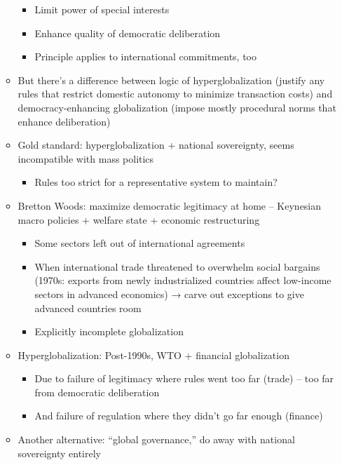 \begin{itemize}
\begin{itemize}
    \begin{itemize}
    \tightlist
    \item
      Limit power of special interests
    \item
      Enhance quality of democratic deliberation
    \item
      Principle applies to international commitments, too
    \end{itemize}
  \item
    But there's a difference between logic of hyperglobalization
    (justify any rules that restrict domestic autonomy to minimize
    transaction costs) and democracy-enhancing globalization (impose
    mostly procedural norms that enhance deliberation)
  \item
    Gold standard: hyperglobalization + national sovereignty, seems
    incompatible with mass politics

    \begin{itemize}
    \tightlist
    \item
      Rules too strict for a representative system to maintain?
    \end{itemize}
  \item
    Bretton Woods: maximize democratic legitimacy at home -- Keynesian
    macro policies + welfare state + economic restructuring

    \begin{itemize}
    \tightlist
    \item
      Some sectors left out of international agreements
    \item
      When international trade threatened to overwhelm social bargains
      (1970s: exports from newly industrialized countries affect
      low-income sectors in advanced economics) → carve out exceptions
      to give advanced countries room
    \item
      Explicitly incomplete globalization
    \end{itemize}
  \item
    Hyperglobalization: Post-1990s, WTO + financial globalization

    \begin{itemize}
    \tightlist
    \item
      Due to failure of legitimacy where rules went too far (trade) --
      too far from democratic deliberation
    \item
      And failure of regulation where they didn't go far enough
      (finance)
    \end{itemize}
  \item
    Another alternative: ``global governance,'' do away with national
    sovereignty entirely


\end{itemize}
\end{itemize}
